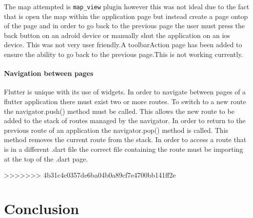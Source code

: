 The map attempted is \texttt{map\_view} plugin however this was not ideal due to the fact that is open the map within the application page but instead create a page ontop of the page and in order to go back to the previous page the user must press the back button on an adroid device or manually shut the application on an ios device. This was not very user friendly.A toolbarAction page has been added to ensure the ability to go back to the previous page.This is not working currently.

\subsubsection{Navigation between pages}
Flutter is unique with its use of widgets. In order to navigate between pages of a flutter application there must exist two or more routes. To switch to a new route the navigator.push() method must be called. This allows the new route to be added to the stack of routes managed by the navigator. In order to return to the previous route of an application the navigator.pop() method is called. This method removes the current route from the stack. In order to access a route that is in a different .dart file the correct file containing the route must be importing at the top of the .dart page.


>>>>>>> 4b31c4c0357de6ba04b0a89cf7e4700bb141ff2e
\chapter{Conclusion}

 






 


